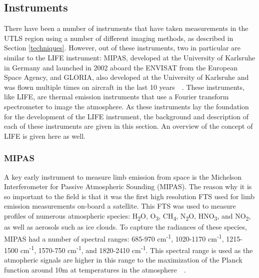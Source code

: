 \subsection{Instruments} \label{instruments}
There have been a number of instruments that have taken measurements in the UTLS region using a number of different imaging methods, as described in Section \ref{techniques}. However, out of these instruments, two in particular are similar to the LIFE instrument: MIPAS, developed at the University of Karlsruhe in Germany and launched in 2002 aboard the ENVISAT from the European Space Agency, and GLORIA, also developed at the University of Karlsruhe and was flown multiple times on aircraft in the last 10 years~\citep{MIPAS_instrument}~\citep{GLORIA_concept}. These instruments, like LIFE, are thermal emission instruments that use a Fourier transform spectrometer to image the atmosphere. As these instruments lay the foundation for the development of the LIFE instrument, the background and description of each of these instruments are given in this section. An overview of the concept of LIFE is given here as well.

\subsubsection{MIPAS}
A key early instrument to measure limb emission from space is the Michelson Interferometer for Passive Atmospheric Sounding (MIPAS). The reason why it is so important to the field is that it was the first high resolution FTS used for limb emission measurements on-board a satellite. This FTS was used to measure profiles of numerous atmospheric species: H\textsubscript{2}O, O\textsubscript{3}, CH\textsubscript{4}, N\textsubscript{2}O, HNO\textsubscript{3}, and NO\textsubscript{2}, as well as aerosols such as ice clouds. To capture the radiances of these species, MIPAS had a number of spectral ranges: 685-970 cm\textsuperscript{-1}, 1020-1170 cm\textsuperscript{-1}, 1215-1500 cm\textsuperscript{-1}, 1570-750 cm\textsuperscript{-1}, and 1820-2410 cm\textsuperscript{-1}. This spectral range is used as the atmopheric signals are higher in this range to the maximization of the Planck function around 10\textmu m at temperatures in the atmosphere~\citep{MIPAS_instrument}~\citep{MIPAS_conference}.

